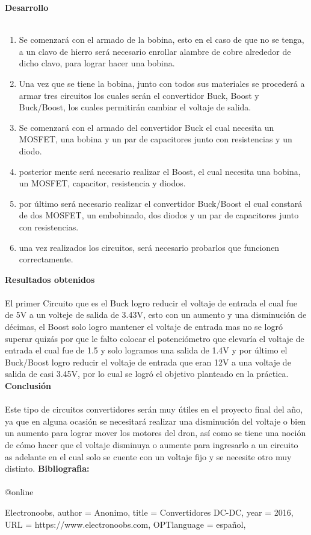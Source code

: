 \documentclass[12pt]{report}
\begin{document}
{\huge \textbf{Desarrollo}\\}\\
{\large \begin{enumerate}
\item Se comenzará con el armado de la bobina, esto en el caso de que no se tenga, a un clavo de hierro será necesario enrollar alambre de cobre alrededor de dicho clavo, para lograr hacer una bobina.
\item Una vez que se tiene la bobina, junto con todos sus materiales se procederá a armar tres circuitos los cuales serán el convertidor Buck, Boost y Buck/Boost, los cuales permitirán cambiar el voltaje de salida.
\item Se comenzará con el armado del convertidor Buck el cual necesita un MOSFET, una bobina y un par de capacitores junto con resistencias y un diodo.
\item posterior mente será necesario realizar el Boost, el cual necesita una bobina, un MOSFET, capacitor, resistencia y diodos.
\item por último será necesario realizar el convertidor Buck/Boost el cual constará de dos MOSFET, un embobinado, dos diodos y un par de capacitores junto con resistencias.
\item una vez realizados los circuitos, será necesario probarlos que funcionen correctamente.

\end{enumerate}}

{\huge \textbf{Resultados obtenidos}\\}\\
{\large El primer Circuito que es el Buck logro reducir el voltaje de entrada el cual fue de 5V a un volteje de salida de 3.43V, esto con un aumento y una disminución de décimas, el Boost solo logro mantener el voltaje de entrada mas no se logró superar quizás por que le falto colocar el potenciómetro que elevaría el voltaje de entrada el cual fue de 1.5 y solo logramos una salida de 1.4V y por último el Buck/Boost logro reducir el voltaje de entrada que eran 12V a una voltaje de salida de casi 3.45V, por lo cual se logró el objetivo planteado en la práctica.  }\\


{\huge \textbf{Conclusión}\\}\\
{\large Este tipo de circuitos convertidores serán muy útiles en el proyecto final del año, ya que en alguna ocasión se necesitará realizar una disminución del voltaje o bien un aumento para lograr mover los motores del dron, así como se tiene una noción de cómo hacer que el voltaje disminuya o aumente para ingresarlo a un circuito as adelante en el cual solo se cuente con un voltaje fijo y se necesite otro muy distinto.}
\newpage
{\huge \textbf{Bibliografia:}\\}\\

@online{Electronoobs,
author = {Anonimo},
title = {Convertidores DC-DC},
year = {2016},
URL = {https://www.electronoobs.com},
OPTlanguage = {español},

}
\end{document}

